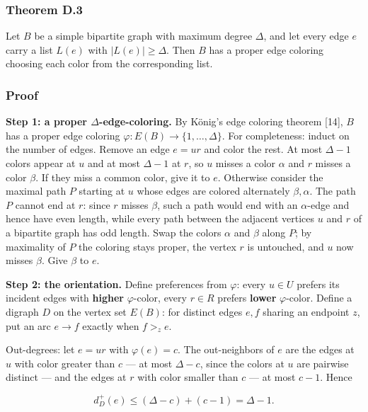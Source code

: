 \documentclass[
  11pt,
]{article}
\begin{document}
\subsubsection{Theorem D.3}\label{theorem-d.3-galvin-maximum-degree-case}

Let \(B\) be a simple bipartite graph with maximum degree \(\Delta\),
and let every edge \(e\) carry a list \(L(e)\) with \(|L(e)|\ge\Delta\).
Then \(B\) has a proper edge coloring choosing each color from the
corresponding list.

\subsubsection{Proof}\label{proof-9}

\textbf{Step 1: a proper \(\Delta\)-edge-coloring.} By König's edge
coloring theorem {[}14{]}, \(B\) has a proper edge coloring
\(\varphi:E(B)\to\{1,\ldots,\Delta\}\). For completeness: induct on the
number of edges. Remove an edge \(e=ur\) and color the rest. At most
\(\Delta-1\) colors appear at \(u\) and at most \(\Delta-1\) at \(r\),
so \(u\) misses a color \(\alpha\) and \(r\) misses a color \(\beta\).
If they miss a common color, give it to \(e\). Otherwise consider the
maximal path \(P\) starting at \(u\) whose edges are colored alternately
\(\beta,\alpha\). The path \(P\) cannot end at \(r\): since \(r\) misses
\(\beta\), such a path would end with an \(\alpha\)-edge and hence have
even length, while every path between the adjacent vertices \(u\) and
\(r\) of a bipartite graph has odd length. Swap the colors \(\alpha\)
and \(\beta\) along \(P\); by maximality of \(P\) the coloring stays
proper, the vertex \(r\) is untouched, and \(u\) now misses \(\beta\).
Give \(\beta\) to \(e\).

\textbf{Step 2: the orientation.} Define preferences from \(\varphi\):
every \(u\in U\) prefers its incident edges with \textbf{higher}
\(\varphi\)-color, every \(r\in R\) prefers \textbf{lower}
\(\varphi\)-color. Define a digraph \(D\) on the vertex set \(E(B)\):
for distinct edges \(e,f\) sharing an endpoint \(z\), put an arc
\(e\to f\) exactly when \(f>_ze\).

Out-degrees: let \(e=ur\) with \(\varphi(e)=c\). The out-neighbors of
\(e\) are the edges at \(u\) with color greater than \(c\) --- at most
\(\Delta-c\), since the colors at \(u\) are pairwise distinct --- and
the edges at \(r\) with color smaller than \(c\) --- at most \(c-1\).
Hence

\[
d^+_D(e)\le(\Delta-c)+(c-1)=\Delta-1.
\]
\end{document}
